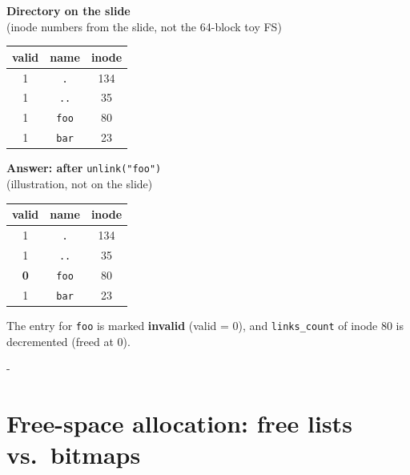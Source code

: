 \documentclass[11pt,a4paper]{article}
\makeatletter
\newcommand{\keepspace}[1]{\par\penalty-100\begingroup
  \setlength{\dimen@}{#1}\dimen@ii\pagegoal\advance\dimen@ii-\pagetotal
  \ifdim\dimen@>\dimen@ii\ifdim\dimen@ii>\z@\vfil\fi\break\fi\endgroup}
\makeatother
\begin{document}
\begin{center}
\begin{minipage}[t]{0.38\textwidth}
\centering
\textbf{Directory on the slide}\\[0.1em]
{\footnotesize (inode numbers from the slide, not the 64-block toy FS)}\\[0.2em]
\renewcommand{\arraystretch}{1.2}
\begin{tabular}{@{}ccc@{}}
  \toprule
  \textbf{valid} & \textbf{name} & \textbf{inode} \\
  \midrule
  1 & \texttt{.}   & 134 \\
  1 & \texttt{..}  & 35 \\
  1 & \texttt{foo} & 80 \\
  1 & \texttt{bar} & 23 \\
  \bottomrule
\end{tabular}
\end{minipage}
\begin{minipage}[t]{0.38\textwidth}
\centering
\textbf{Answer: after} \texttt{unlink("foo")}\\[0.1em]
{\footnotesize (illustration, not on the slide)}\\[0.2em]
\renewcommand{\arraystretch}{1.2}
\begin{tabular}{@{}ccc@{}}
  \toprule
  \textbf{valid} & \textbf{name} & \textbf{inode} \\
  \midrule
  1 & \texttt{.}   & 134 \\
  1 & \texttt{..}  & 35 \\
  \textbf{0} & \texttt{foo} & 80 \\
  1 & \texttt{bar} & 23 \\
  \bottomrule
\end{tabular}
\end{minipage}
\end{center}


\begin{quizbox}
The entry for \texttt{foo} is marked \textbf{invalid} (valid = 0), and
\texttt{links\_count} of inode 80 is decremented (freed at 0).
\end{quizbox}

\keepspace{8\baselineskip}
\section{Free-space allocation: free lists vs.\ bitmaps}
\end{document}
